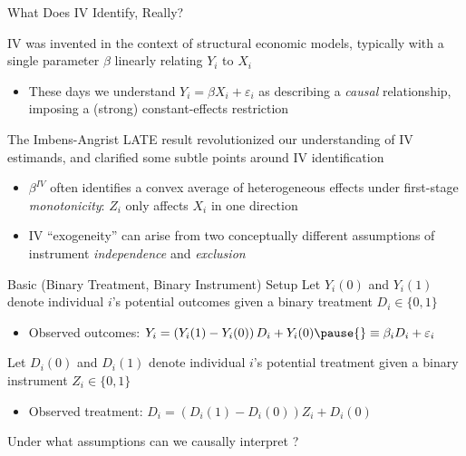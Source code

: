 \documentclass{beamer}
\begin{document}
\begin{frame}{What Does IV Identify, Really?}

IV was invented in the context of structural economic models, typically with a single parameter $\beta$ linearly relating $Y_i$ to $X_i$ 
\begin{itemize}
\item These days we understand $Y_i=\beta X_i+\varepsilon_i$ as describing a \emph{causal} relationship, imposing a (strong) constant-effects restriction
\end{itemize} \pause{}\medskip

The Imbens-Angrist LATE result revolutionized our understanding of IV estimands, and clarified some subtle points around IV identification
\begin{itemize}
\item $\beta^{IV}$ often identifies a convex average of heterogeneous effects under first-stage \emph{monotonicity}: $Z_i$ only affects $X_i$ in one direction
\item IV ``exogeneity'' can arise from two conceptually different assumptions of instrument \emph{independence} and \emph{exclusion}
\end{itemize}
\end{frame}

\begin{frame}{Basic (Binary Treatment, Binary Instrument) Setup}
Let $Y_i(0)$ and $Y_i(1)$ denote individual $i$'s potential outcomes given a binary treatment $D_i\in\{0,1\}$\smallskip
\begin{itemize}
\item Observed outcomes: $Y_i=\left(Y_i(1)-Y_i(0)\right)D_i+Y_i(0)\pause{}\equiv\beta_i D_i+\varepsilon_i$
\end{itemize}\medskip\pause{}
Let $D_i(0)$ and $D_i(1)$ denote individual $i$'s potential treatment given a binary instrument $Z_i\in\{0,1\}$\smallskip
\begin{itemize}
\item Observed treatment: $D_i=\left(D_i(1)-D_i(0)\right)Z_i+D_i(0)$
\end{itemize}\medskip\pause{}
Under what assumptions can we causally interpret ?
\end{frame}
\end{document}
